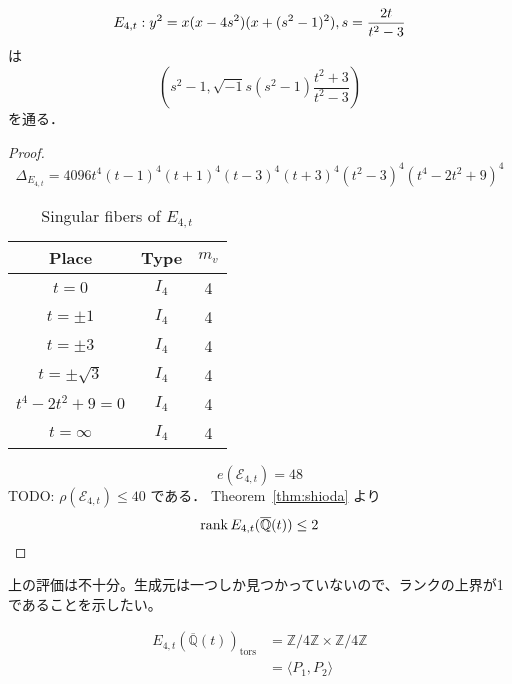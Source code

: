\documentclass[main]{subfiles}
\begin{document}
\begin{thm}
    \begin{equation}
        \label{eq:E_{4t}}
        E_{4,t}: y^{2} = x(x - 4s^{2})(x + (s^{2} - 1)^{2}), s = \frac{2t}{t^{2} - 3}
    \end{equation}
    は
    \begin{equation}
        \left(s^{2} - 1, \sqrt{-1} s(s^{2} - 1) \frac{t^{2} + 3}{t^{2} - 3} \right)
    \end{equation}
    を通る．
\end{thm}
\begin{proof}
    \begin{equation}
        \Delta_{E_{4,t}} = 4096t^{4}(t - 1)^{4}(t + 1)^{4}(t - 3)^{4}(t + 3)^{4}(t^{2} - 3)^{4}(t^{4} - 2t^{2} + 9)^{4}
    \end{equation}
    \begin{table}[h]
        \centering
        \caption{Singular fibers of $E_{4,t}$}
        \begin{tabular}{|c|c|c|}
            \hline
            Place            & Type  & $m_v$ \\
            \hline
            $t=0$            & $I_4$ & 4     \\
            $t=\pm 1$        & $I_4$ & 4     \\
            $t=\pm 3$        & $I_4$ & 4     \\
            $t=\pm \sqrt{3}$ & $I_4$ & 4     \\
            $t^4-2t^2+9=0$   & $I_4$ & 4     \\
            $t=\infty$       & $I_4$ & 4     \\
            \hline
        \end{tabular}
    \end{table}
    \begin{equation}
        e(\mathcal{E}_{4,t}) = 48
    \end{equation}
    TODO: $\rho(\mathcal{E}_{4,t}) \leq 40$ である．
    Theorem~\ref{thm:shioda} より
    \begin{equation}
        \operatorname{rank} E_{4,t}(\overline{\mathbb{Q}}(t)) \leq 2
    \end{equation}
\end{proof}

上の評価は不十分。生成元は一つしか見つかっていないので、ランクの上界が1であることを示したい。

\begin{thm}
    \begin{equation}
        \begin{aligned}
            E_{4,t}(\overline{\mathbb{Q}}(t))_ \text{tors} &= \mathbb{Z} / 4 \mathbb{Z} \times \mathbb{Z} / 4 \mathbb{Z} \\
                                                           &= \langle P_{1}, P_{2} \rangle
        \end{aligned}
    \end{equation}
\end{thm}
\end{document}
